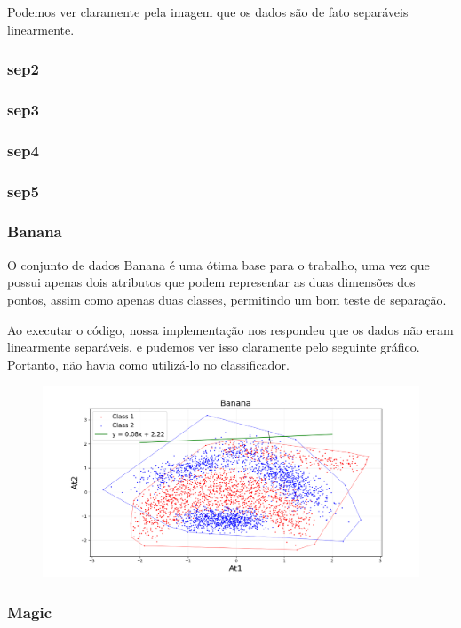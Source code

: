\documentclass{article}
\begin{document}
Podemos ver claramente pela imagem que os dados são de fato separáveis linearmente.

\subsubsection{sep2}

\subsubsection{sep3}

\subsubsection{sep4}

\subsubsection{sep5}

\subsubsection{Banana}

O conjunto de dados Banana é uma ótima base para o trabalho, uma vez que possui apenas dois atributos que podem representar as duas dimensões dos pontos, assim como apenas duas classes, permitindo um bom teste de separação.

Ao executar o código, nossa implementação nos respondeu que os dados não eram linearmente separáveis, e pudemos ver isso claramente pelo seguinte gráfico. Portanto, não havia como utilizá-lo no classificador.

\begin{figure} [H]
	\includegraphics[width=12cm]{banana.png}
	\centering
\end{figure}

\subsubsection{Magic}
\end{document}
